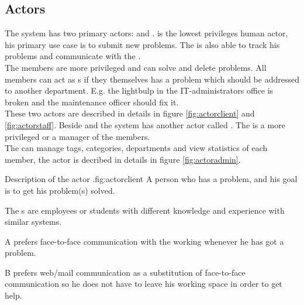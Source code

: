 \subsection{Actors}
\label{sec:actors}


The system has two primary actors:   \aclient{} and \astaff. \aclient[c] is the lowest privileges human actor, his primary use case is to submit new problems. The \aclient[] is also able to track his problems and communicate with the \astaff[]. \\




The \astaff{} members are more privileged and can solve and delete problems. 
All \astaff{} members can act as \aclient{}s if they themselves has a problem which should be addressed to another department. 
E.g. the lightbulp in the IT-administrators office is broken and the maintenance officer should fix it. \\
These two actors are described in details in figure \ref{fig:actorclient} and \ref{fig:actorstaff}. 
Beside \astaff{} and \aclient{} the system has another actor called \sadmin{}. 
The \sadmin{} is a more privileged \astaff{} or a manager of the \astaff members. \\

The \sadmin{} can manage tags, categories, departments and view statistics of each \astaff member, the actor \admin[] is decribed in details in figure \ref{fig:actoradmin}.

\begin{sadlist}[h]{\Aclient}{Description of the actor \aclient.}{fig:actorclient}
 A person who has a problem, and his goal is to get his problem(s) solved.

 The \aclient{}s are employees or students with different knowledge and experience with similar systems.%

 \Aclient{} A prefers face-to-face communication with the working \astaff{} whenever he has got a problem. 

\aclient[c] B prefers web/mail communication as a substitution of face-to-face communication so he does not have to leave his working space in order to get help. 

\end{sadlist} 


